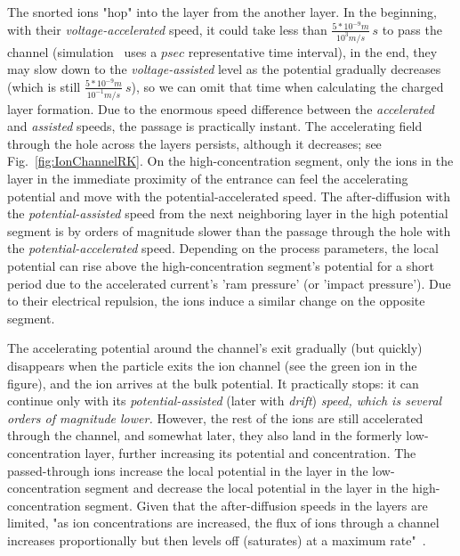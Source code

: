 The snorted ions "hop" into the layer from the another layer.
In the beginning, with
their \emph{voltage-accelerated} speed, it could take less than $\frac{5*10^{-9}m}{10^{3}m/s}\ s$
to pass the channel (simulation~\cite{IonChannelSimulation:2016}
uses a $psec$ representative time interval), in the end, they may
slow down to the \emph{voltage-assisted} level as the potential gradually
decreases (which is still $\frac{5*10^{-9}m}{10^{-1}m/s}\ s$), so
we can omit that time when calculating the charged layer formation.
Due to the enormous speed difference between the \emph{accelerated}
and \emph{assisted} speeds, the passage is practically instant. The
accelerating field through the hole across the layers persists, although
it decreases; see Fig.~\ref{fig:IonChannelRK}. On the high-concentration segment, only the ions in the
layer in the immediate proximity of the entrance can feel the accelerating
potential and move with the potential-accelerated speed. The after-diffusion
with the \emph{potential-assisted} speed from the next neighboring
layer in the high potential segment is by orders of magnitude slower than the passage through the
hole with the \emph{potential-accelerated} speed. Depending on the
process parameters, the local potential can rise above the high-concentration
segment's potential for a short period due to the accelerated current's 'ram pressure' (or
'impact pressure'). Due to their electrical repulsion, the ions induce
a similar change on the opposite segment.

The accelerating potential around the channel's exit gradually (but quickly) disappears when
the particle exits the ion channel (see the green ion in the figure),
and the ion arrives at the bulk potential. It practically stops: it
can continue only with its \emph{potential-assisted }(later with\emph{
drift})\emph{ speed, which is several orders of magnitude lower.}
However, the rest of the ions are still accelerated through the channel,
and somewhat later, they also land in the formerly low-concentration
layer, further increasing its potential and concentration. The passed-through
ions increase the local potential in the layer in the low-concentration
segment and decrease the local potential in the layer in the high-concentration
segment. Given that the after-diffusion speeds in the layers are limited,
"as ion concentrations are increased, the flux of ions through a
channel increases proportionally but then levels off (saturates) at
a maximum rate"~\cite{MolecularBiology:2002}.

